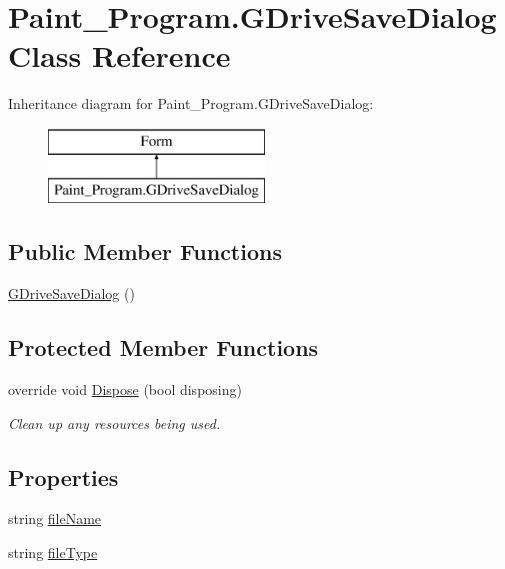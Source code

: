 \hypertarget{class_paint___program_1_1_g_drive_save_dialog}{}\section{Paint\+\_\+\+Program.\+G\+Drive\+Save\+Dialog Class Reference}
\label{class_paint___program_1_1_g_drive_save_dialog}
Inheritance diagram for Paint\+\_\+\+Program.\+G\+Drive\+Save\+Dialog\+:\begin{figure}[H]
\begin{center}
\leavevmode
\includegraphics[height=2.000000cm]{class_paint___program_1_1_g_drive_save_dialog}
\end{center}
\end{figure}
\subsection*{Public Member Functions}
\begin{DoxyCompactItemize}
\item 
\mbox{\hyperlink{class_paint___program_1_1_g_drive_save_dialog_af0373baa9cc05fb6effe27ceb1f3063c}{G\+Drive\+Save\+Dialog}} ()
\end{DoxyCompactItemize}
\subsection*{Protected Member Functions}
\begin{DoxyCompactItemize}
\item 
override void \mbox{\hyperlink{class_paint___program_1_1_g_drive_save_dialog_ab6f349330bc5f3d3df824c7d1449ddc4}{Dispose}} (bool disposing)
\begin{DoxyCompactList}\small\item\em Clean up any resources being used. \end{DoxyCompactList}\end{DoxyCompactItemize}
\subsection*{Properties}
\begin{DoxyCompactItemize}
\item 
string \mbox{\hyperlink{class_paint___program_1_1_g_drive_save_dialog_a3cc969d8399b55a95fe053cdf11ce616}{file\+Name}}
\item 
string \mbox{\hyperlink{class_paint___program_1_1_g_drive_save_dialog_a7d92d2b564d15192cba1ecac3e2d0eea}{file\+Type}}
\end{DoxyCompactItemize}

